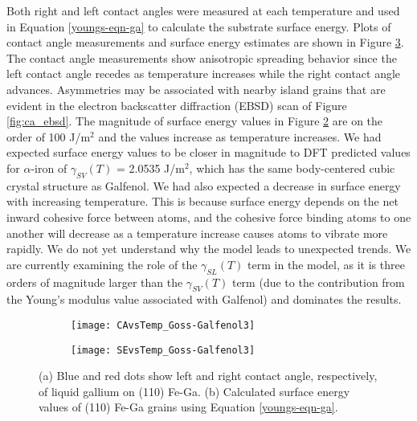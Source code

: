 Both right and left contact angles were measured at each temperature and used in Equation \ref{youngs-eqn-ga} to calculate the substrate surface energy. Plots of contact angle measurements and surface energy estimates are shown in Figure \ref{fig:goss_se_msrmnt}. The contact angle measurements show anisotropic spreading behavior since the left contact angle recedes as temperature increases while the right contact angle advances. Asymmetries may be associated with nearby island grains that are evident in the electron backscatter diffraction (EBSD) scan of Figure \ref{fig:ca_ebsd}. The magnitude of surface energy values in Figure \ref{fig:goss_ga_se} are on the order of 100 J/m$^2$ and the values increase as temperature increases. We had expected surface energy values to be closer in magnitude to DFT predicted values for $\alpha$-iron of $ \gamma_{SV}(T)$ = 2.0535 J/m$^2$, which has the same body-centered cubic crystal structure as Galfenol.\cite{Wang2000} We had also expected a decrease in surface energy with increasing temperature. This is because surface energy depends on the net inward cohesive force between atoms, and the cohesive force binding atoms to one another will decrease as a temperature increase causes atoms to vibrate more rapidly. We do not yet understand why the model leads to unexpected trends. We are currently examining the role of the $\gamma_{SL}(T)$ term in the model, as it is three orders of magnitude larger than the $\gamma_{SV}(T)$ term (due to the contribution from the Young's modulus value associated with Galfenol) and dominates the results.

\begin{figure}[h]
	\centering
	\begin{subfigure}[c]{0.47\textwidth}
		\texttt{[image: CAvsTemp\_Goss-Galfenol3]}
		\subcaption{~}
		\label{fig:goss_ga_ca}		
	\end{subfigure}
	\begin{subfigure}[c]{0.47\textwidth} 
		\texttt{[image: SEvsTemp\_Goss-Galfenol3]}
		\subcaption{~}
		\label{fig:goss_ga_se}		
	\end{subfigure}
	\caption{(a) Blue and red dots show left and right contact angle, respectively, of liquid gallium on \hkl(110) Fe-Ga. (b) Calculated surface energy values of \hkl(110) Fe-Ga grains using Equation \ref{youngs-eqn-ga}.}
	\label{fig:goss_se_msrmnt}
\end{figure}





